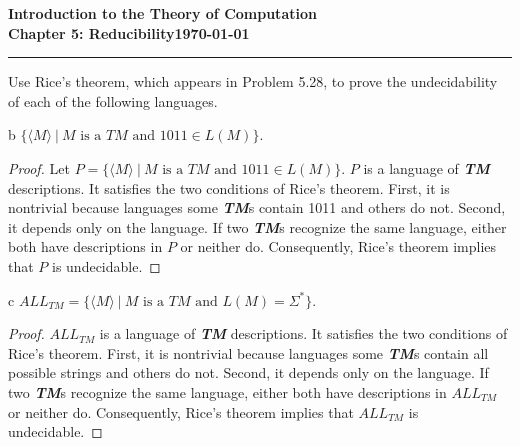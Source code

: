 \documentclass[11pt]{article}
\newcommand{\dated}{\today}
\begin{document}
\textbf{Introduction to the Theory of
Computation}\hfill\textbf{\myname}\\[0.01in]
\textbf{Chapter 5: Reducibility}\hfill\textbf{\dated}\\
\smallskip\hrule\bigskip

\begin{problem}{5.30}
Use Rice’s theorem, which appears in Problem 5.28, to prove the undecidability of each of the following languages.
\end{problem}

\begin{problem}[Part]{b}
$\{\langle M \rangle \ | \ M \text{ is a } TM \text{ and } 1011 \in L(M)\}$.
\end{problem}

\begin{proof}
Let $P = \{\langle M \rangle \ | \ M \text{ is a } TM \text{ and } 1011 \in L(M)\}$. $P$ is a language of \textbf{\textit{TM}} descriptions. It satisfies the two conditions of Rice’s theorem. First, it is nontrivial because languages some \textbf{\textit{TM}}s contain 1011 and others do not. Second, it depends only on the language. If two \textbf{\textit{TM}}s recognize the same language, either both have descriptions in $P$ or neither do. Consequently, Rice’s theorem implies that $P$ is undecidable.
\end{proof}

\begin{problem}[Part]{c}
$ALL_{TM} = \{\langle M \rangle \ | \ M \text{ is a } TM \text{ and } L(M ) = \Sigma^{*}\}$.
\end{problem}

\begin{proof}
$ALL_{TM}$ is a language of \textbf{\textit{TM}} descriptions. It satisfies the two conditions of Rice’s theorem. First, it is nontrivial because languages some \textbf{\textit{TM}}s contain all possible strings and others do not. Second, it depends only on the language. If two \textbf{\textit{TM}}s recognize the same language, either both have descriptions in $ALL_{TM}$ or neither do. Consequently, Rice’s theorem implies that $ALL_{TM}$ is undecidable.
\end{proof}
\end{document}
